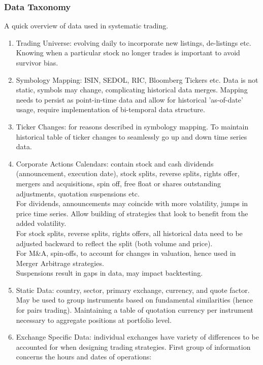 \subsubsection{Data Taxonomy}

A quick overview of data used in systematic trading.

\begin{definition} 
\begin{enumerate}[label=\roman*.]
\setlength{\itemsep}{0pt}
\item Trading Universe: evolving daily to incorporate new listings, de-listings etc. Knowing when a particular stock no longer trades is important to avoid survivor bias.
\item Symbology Mapping: ISIN, SEDOL, RIC, Bloomberg Tickers etc. Data is not static, symbols may change, complicating historical data merges. Mapping needs to persist as point-in-time data and allow for historical 'as-of-date' usage, require implementation of bi-temporal data structure. 
\item Ticker Changes: for reasons described in symbology mapping. To maintain historical table of ticker changes to seamlessly go up and down time series data.
\item Corporate Actions Calendars: contain stock and cash dividends (announcement, execution date), stock splits, reverse splits, rights offer, mergers and acquisitions, spin off, free float or shares outstanding adjustments, quotation suspensions etc.\\
For dividends, announcements may coincide with more volatility, jumps in price time series. Allow building of strategies that look to benefit from the added volatility.\\
For stock splits, reverse splits, rights offers, all historical data need to be adjusted backward to reflect the split (both volume and price).\\
For M\&A, spin-offs, to account for changes in valuation, hence used in Merger Arbitrage strategies.\\
Suspensions result in gaps in data, may impact backtesting.
\item Static Data: country, sector, primary exchange, currency, and quote factor. May be used to group instruments based on fundamental similarities (hence for pairs trading). Maintaining a table of quotation currency per instrument necessary to aggregate positions at portfolio level.
\item Exchange Specific Data: individual exchanges have variety of differences to be accounted for when designing trading strategies. First group of information concerns the hours and dates of operations:

\end{enumerate}
\end{definition}
